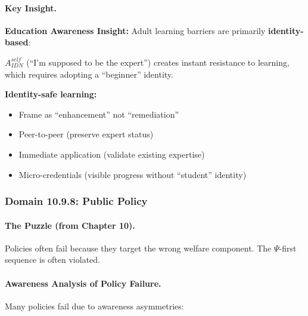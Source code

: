\paragraph{Key Insight.}
\begin{tcolorbox}[colback=yellow!10!white, colframe=yellow!50!black]
\textbf{Education Awareness Insight:}
Adult learning barriers are primarily \textbf{identity-based}:

$A^{self}_{IDN}$ (``I'm supposed to be the expert'') creates instant 
resistance to learning, which requires adopting a ``beginner'' identity.

\textbf{Identity-safe learning:}
\begin{itemize}
\item Frame as ``enhancement'' not ``remediation''
\item Peer-to-peer (preserve expert status)
\item Immediate application (validate existing expertise)
\item Micro-credentials (visible progress without ``student'' identity)
\end{itemize}
\end{tcolorbox}

\subsubsection{Domain 10.9.8: Public Policy}
\label{subsubsec:awareness-policy}

\paragraph{The Puzzle (from Chapter 10).}
Policies often fail because they target the wrong welfare component.
The $\Psi$-first sequence is often violated.

\paragraph{Awareness Analysis of Policy Failure.}
Many policies fail due to awareness asymmetries:

